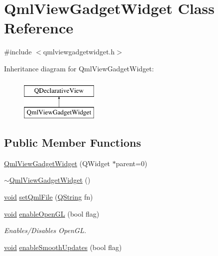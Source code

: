 \hypertarget{class_qml_view_gadget_widget}{\section{Qml\-View\-Gadget\-Widget Class Reference}
\label{class_qml_view_gadget_widget}
}


{\ttfamily \#include $<$qmlviewgadgetwidget.\-h$>$}

Inheritance diagram for Qml\-View\-Gadget\-Widget\-:\begin{figure}[H]
\begin{center}
\leavevmode
\includegraphics[height=2.000000cm]{class_qml_view_gadget_widget}
\end{center}
\end{figure}
\subsection*{Public Member Functions}
\begin{DoxyCompactItemize}
\item 
\hyperlink{group___o_p_map_plugin_ga5f276e99396b6fdc55b2809358cdc036}{Qml\-View\-Gadget\-Widget} (Q\-Widget $\ast$parent=0)
\item 
\hyperlink{group___o_p_map_plugin_gab474fe9554896c3815e74bd3979a54a9}{$\sim$\-Qml\-View\-Gadget\-Widget} ()
\item 
\hyperlink{group___u_a_v_objects_plugin_ga444cf2ff3f0ecbe028adce838d373f5c}{void} \hyperlink{group___o_p_map_plugin_gadd4680d8e3dc82c1a2fc6812c609535d}{set\-Qml\-File} (\hyperlink{group___u_a_v_objects_plugin_gab9d252f49c333c94a72f97ce3105a32d}{Q\-String} fn)
\item 
\hyperlink{group___u_a_v_objects_plugin_ga444cf2ff3f0ecbe028adce838d373f5c}{void} \hyperlink{group___o_p_map_plugin_gae8d1d0bb3f42b7107492b4e146544e5d}{enable\-Open\-G\-L} (bool flag)
\begin{DoxyCompactList}\small\item\em Enables/\-Disables Open\-G\-L. \end{DoxyCompactList}\item 
\hyperlink{group___u_a_v_objects_plugin_ga444cf2ff3f0ecbe028adce838d373f5c}{void} \hyperlink{group___o_p_map_plugin_ga6c243c31f5bf4653f0bbd7b10527beb3}{enable\-Smooth\-Updates} (bool flag)
\end{DoxyCompactItemize}


